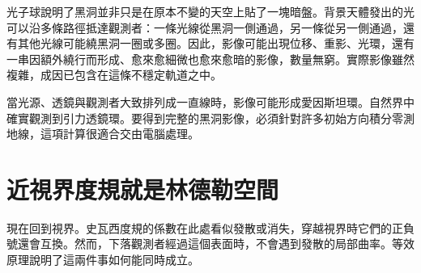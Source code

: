 光子球說明了黑洞並非只是在原本不變的天空上貼了一塊暗盤。背景天體發出的光可以沿多條路徑抵達觀測者：一條光線從黑洞一側通過，另一條從另一側通過，還有其他光線可能繞黑洞一圈或多圈。因此，影像可能出現位移、重影、光環，還有一串因額外繞行而形成、愈來愈細微也愈來愈暗的影像，數量無窮。實際影像雖然複雜，成因已包含在這條不穩定軌道之中。

當光源、透鏡與觀測者大致排列成一直線時，影像可能形成愛因斯坦環。自然界中確實觀測到引力透鏡環。要得到完整的黑洞影像，必須針對許多初始方向積分零測地線，這項計算很適合交由電腦處理。

\begin{classroomqa}
\end{classroomqa}

\begin{classroomqa}
\end{classroomqa}

\begin{classroomqa}
\end{classroomqa}

\section{近視界度規就是林德勒空間}

現在回到視界。史瓦西度規的係數在此處看似發散或消失，穿越視界時它們的正負號還會互換。然而，下落觀測者經過這個表面時，不會遇到發散的局部曲率。等效原理說明了這兩件事如何能同時成立。

